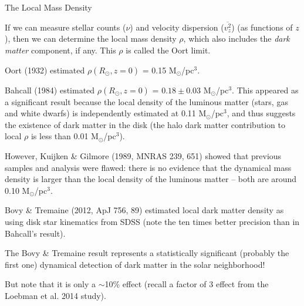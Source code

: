\documentclass[letterpaper,landscape]{slides}
\begin{document}
\begin{slide}
\begin{center}
{\large \color{red} 
                    The Local Mass Density   }
\end{center}



If we can measure stellar counts ($\nu$) and velocity dispersion ($\overline{v_z^2}$) 
(as functions of $z$), then we can determine the local mass density $\rho$, which also 
includes the {\it dark matter} component, if any. This $\rho$ is called the Oort limit.

Oort (1932) estimated $\rho(R_\odot,z=0)$ = 0.15 M$_\odot$/pc$^3$.

Bahcall (1984) estimated $\rho(R_\odot,z=0)$ = $0.18\pm0.03$ M$_\odot$/pc$^3$.
This appeared as a significant result because {\color{blue} the local density of the luminous
matter (stars, gas and white dwarfs) is independently estimated at 0.11 M$_\odot$/pc$^3$,}
and thus suggests the existence of dark matter in the disk (the halo dark
matter contribution to local $\rho$ is less than 0.01 M$_\odot$/pc$^3$). 


However, Kuijken \& Gilmore (1989, MNRAS 239, 651) showed that previous samples and
analysis were flawed: {\color{red} there is no evidence that the dynamical
mass density is larger than the local density of the luminous
matter -- both are around 0.10 M$_\odot$/pc$^3$}. 

Bovy \& Tremaine (2012, ApJ 756, 89)  estimated local dark matter density as
using disk star kinematics from SDSS (note the ten times better precision than in Bahcall's result). 

The Bovy \& Tremaine result represents a statistically significant (probably
the first one) dynamical detection of dark matter in the solar neighborhood!   

But note that it is only a $\sim$10\% effect (recall a factor of 3 effect from the Loebman et al. 2014 study). 


\vfill
\end{slide}
\end{document}
